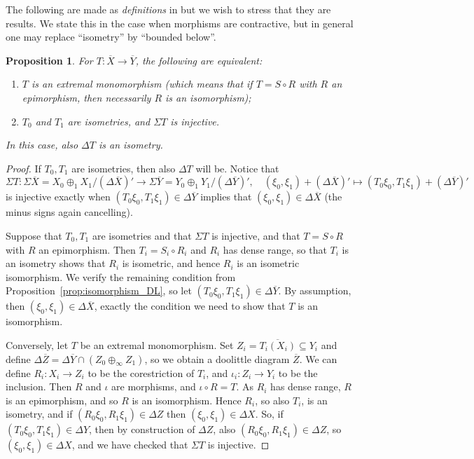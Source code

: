 \documentclass[a4paper,11pt]{article}
\theoremstyle{plain}
\newtheorem{proposition}{Proposition}[section]
\theoremstyle{remark}
\begin{document}
The following are made as \emph{definitions} in \cite[Definition~3.5]{KP_InterpolationFunctorsDuality} but we wish to stress that they are results.  We state this in the case when morphisms are contractive, but in general one may replace ``isometry'' by ``bounded below''.

\begin{proposition}\label{prop:ex_monomorphism_DL}
For $T\colon\overline X\to\overline Y$, the following are equivalent:
\begin{enumerate}
  \item $T$ is an extremal monomorphism (which means that if $T = S\circ R$ with $R$ an epimorphism, then necessarily $R$ is an isomorphism);
  \item $T_0$ and $T_1$ are isometries, and $\Sigma T$ is injective.
\end{enumerate}
In this case, also $\Delta T$ is an isometry.
\end{proposition}
\begin{proof}
If $T_0,T_1$ are isometries, then also $\Delta T$ will be.  Notice that
\[ \Sigma T \colon \Sigma\overline X = X_0\oplus_1 X_1 / (\Delta\overline X)' \to 
\Sigma\overline Y = Y_0\oplus_1 Y_1 / (\Delta\overline Y)', \quad (\xi_0,\xi_1) + (\Delta\overline X)' \mapsto (T_0\xi_0, T_1\xi_1) + (\Delta\overline Y)' \]
is injective exactly when $(T_0\xi_0, T_1\xi_1) \in \Delta\overline Y$ implies that $(\xi_0,\xi_1) \in \Delta\overline X$ (the minus signs again cancelling).

Suppose that $T_0,T_1$ are isometries and that $\Sigma T$ is injective, and that $T = S\circ R$ with $R$ an epimorphism.  Then $T_i = S_i \circ R_i$ and $R_i$ has dense range, so that $T_i$ is an isometry shows that $R_i$ is isometric, and hence $R_i$ is an isometric isomorphism.  We verify the remaining condition from Proposition~\ref{prop:isomorphism_DL}, so let $(T_0\xi_0, T_1\xi_1) \in \Delta\overline Y$.  By assumption, then $(\xi_0,\xi_1) \in \Delta\overline X$, exactly the condition we need to show that $T$ is an isomorphism.

Conversely, let $T$ be an extremal monomorphism.  Set $Z_i = \overline{ T_i(X_i) } \subseteq Y_i$ and define $\Delta\overline Z = \Delta\overline Y \cap (Z_0\oplus_\infty Z_1)$, so we obtain a doolittle diagram $\overline Z$.  We can define $R_i \colon X_i \to Z_i$ to be the corestriction of $T_i$, and $\iota_i \colon Z_i\to Y_i$ to be the inclusion.  Then $R$ and $\iota$ are morphisms, and $\iota\circ R = T$.  As $R_i$ has dense range, $R$ is an epimorphism, and so $R$ is an isomorphism.  Hence $R_i$, so also $T_i$, is an isometry, and if $(R_0\xi_0, R_1\xi_1) \in \Delta Z$ then $(\xi_0,\xi_1) \in \Delta X$.  So, if $(T_0\xi_0, T_1\xi_1) \in \Delta Y$, then by construction of $\Delta Z$, also $(R_0\xi_0, R_1\xi_1) \in \Delta Z$, so $(\xi_0,\xi_1) \in \Delta X$, and we have checked that $\Sigma T$ is injective.
\end{proof}
\end{document}
